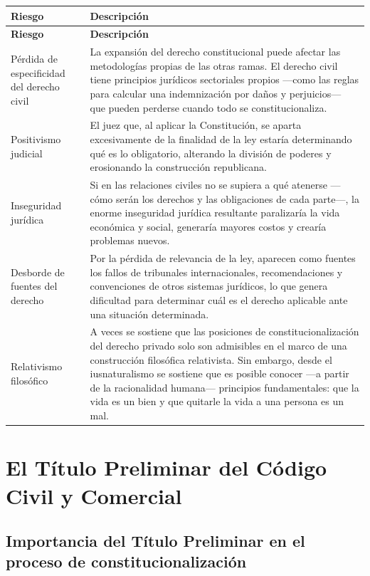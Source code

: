 \documentclass[12pt,oneside]{book}
\begin{document}
\begin{longtable}{|p{}|p{}|}
\hline
\textbf{Riesgo} & \textbf{Descripción} \\
\hline
\endfirsthead
\hline
\textbf{Riesgo} & \textbf{Descripción} \\
\hline
\endhead
\hline
\endfoot
\hline
\endlastfoot
Pérdida de especificidad del derecho civil & La expansión del derecho constitucional puede afectar las metodologías propias de las otras ramas. El derecho civil tiene principios jurídicos sectoriales propios —como las reglas para calcular una indemnización por daños y perjuicios— que pueden perderse cuando todo se constitucionaliza. \\
\hline
Positivismo judicial & El juez que, al aplicar la Constitución, se aparta excesivamente de la finalidad de la ley estaría determinando qué es lo obligatorio, alterando la división de poderes y erosionando la construcción republicana. \\
\hline
Inseguridad jurídica & Si en las relaciones civiles no se supiera a qué atenerse —cómo serán los derechos y las obligaciones de cada parte—, la enorme inseguridad jurídica resultante paralizaría la vida económica y social, generaría mayores costos y crearía problemas nuevos. \\
\hline
Desborde de fuentes del derecho & Por la pérdida de relevancia de la ley, aparecen como fuentes los fallos de tribunales internacionales, recomendaciones y convenciones de otros sistemas jurídicos, lo que genera dificultad para determinar cuál es el derecho aplicable ante una situación determinada. \\
\hline
Relativismo filosófico & A veces se sostiene que las posiciones de constitucionalización del derecho privado solo son admisibles en el marco de una construcción filosófica relativista. Sin embargo, desde el iusnaturalismo se sostiene que es posible conocer —a partir de la racionalidad humana— principios fundamentales: que la vida es un bien y que quitarle la vida a una persona es un mal. \\
\hline
\end{longtable}

\section{El Título Preliminar del Código Civil y Comercial}

\subsection{Importancia del Título Preliminar en el proceso de constitucionalización}
\end{document}
